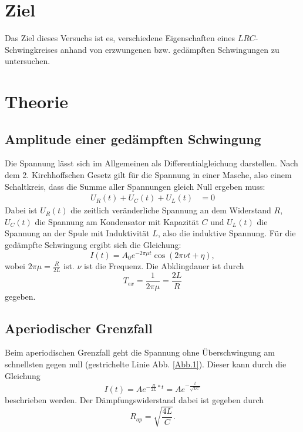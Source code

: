 \section{Ziel}
Das Ziel dieses Versuchs ist es, verschiedene Eigenschaften eines $LRC$-Schwingkreises
anhand von erzwungenen bzw. gedämpften Schwingungen zu untersuchen.

\section{Theorie}
\label{sec:Theorie}
\cite{V354}

\subsection{Amplitude einer gedämpften Schwingung}
Die Spannung lässt sich im Allgemeinen als Differentialgleichung darstellen.
Nach dem 2. Kirchhoffschen Gesetz gilt für die Spannung in einer Masche,
also einem Schaltkreis, dass die Summe aller Spannungen gleich Null ergeben muss:
\begin{align*}
    U_{R}(t)+U_{C}(t)+U_{L}(t) &= 0 
\end{align*}
Dabei ist $U_{R}(t)$ die zeitlich veränderliche Spannung an dem Widerstand $R$,
$U_{C}(t)$ die Spannung am Kondensator mit Kapazität $C$ und $U_{L}(t)$ die Spannung
an der Spule mit Induktivität $L$, also die induktive Spannung.
Für die gedämpfte Schwingung ergibt sich die Gleichung:
\begin{equation}
    I(t)= A_{0} e^{-2 \pi \mu t} \cos(2 \pi \nu t + \eta),
\end{equation}
wobei $2 \pi \mu = \frac{R}{2L}$ ist. $\nu$ ist die Frequenz.
Die Abklingdauer ist durch
\begin{equation}
    T_{ex} = \frac{1}{2 \pi \mu} = \frac{2L}{R}
    \label{eqn:t_ex}
\end{equation}
gegeben.

\subsection{Aperiodischer Grenzfall}
Beim aperiodischen Grenzfall geht die Spannung ohne Überschwingung am schnellsten gegen null
(gestrichelte Linie Abb. \ref{Abb.1}). Dieser kann durch die Gleichung
\begin{equation} 
    I(t)=A e^{-\frac{R}{2L}*t}= A e^{-\frac{t}{\sqrt{LC}}}
\end{equation}
beschrieben werden.
Der Dämpfungswiderstand dabei ist gegeben durch
\begin{equation}
    R_{ap} = \sqrt{\frac{4L}{C}}.
    \label{eqn:r_ap}
\end{equation}

